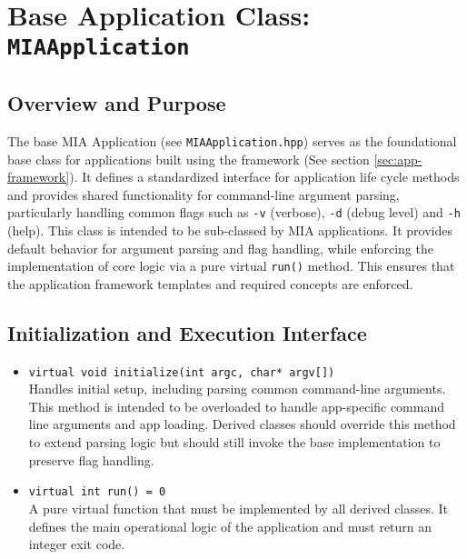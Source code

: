 \section{Base Application Class: \texttt{MIAApplication}}
\label{sec:base-application}

\subsection*{Overview and Purpose}
The base MIA Application (see \texttt{MIAApplication.hpp}) serves as the foundational base class for applications built using the framework (See section \ref{sec:app-framework}). It defines a standardized interface for application life cycle methods and provides shared functionality for command-line argument parsing, particularly handling common flags such as \texttt{-v} (verbose), \texttt{-d} (debug level) and \texttt{-h} (help). This class is intended to be sub-classed by MIA applications. It provides default behavior for argument parsing and flag handling, while enforcing the implementation of core logic via a pure virtual \texttt{run()} method. This ensures that the application framework templates and required concepts are enforced.

\subsection*{Initialization and Execution Interface}
\begin{itemize}\itemsep0em
	\item \texttt{virtual void initialize(int argc, char* argv[])} \\
	Handles initial setup, including parsing common command-line arguments. This method is intended to be overloaded to handle app-specific command line arguments and app loading. Derived classes should override this method to extend parsing logic but should still invoke the base implementation to preserve flag handling.
\end{itemize}

\begin{itemize}\itemsep0em
	\item \texttt{virtual int run() = 0} \\
	A pure virtual function that must be implemented by all derived classes. It defines the main operational logic of the application and must return an integer exit code.
\end{itemize}

